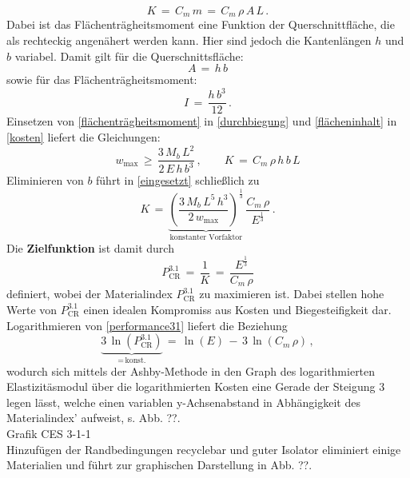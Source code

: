 \begin{equation} \label{kosten}
	K\,=\,C_m\,m\,=\,C_m\,\rho\,A\,L\,.
\end{equation}
Dabei ist das Flächenträgheitsmoment eine Funktion der Querschnittfläche, die als rechteckig angenähert werden kann. Hier sind jedoch die Kantenlängen $h$ und $b$ variabel. Damit gilt für die Querschnittsfläche:
\begin{equation} \label{flächeninhalt}
A\,=\,h\,b
\end{equation}
sowie für das Flächenträgheitsmoment:
\begin{equation} \label{flächenträgheitsmoment}
I\,=\,\frac{h\,b^3}{12}\,.
\end{equation}
Einsetzen von \ref{flächenträgheitsmoment} in \ref{durchbiegung} und \ref{flächeninhalt} in \ref{kosten} liefert die Gleichungen:
\begin{equation} \label{eingesetzt}
	w_{\text{max}}\,\ge\,\frac{3\,M_b \,L^2}{2\,E\,h\,b^3}\,, \qquad
	K\,=\,C_m\,\rho\,h\,b\,L
\end{equation}
Eliminieren von $b$ führt in \ref{eingesetzt} schließlich zu
\begin{equation}\label{performance}
K\,=\,\underbrace{\left(\frac{3\,M_b\,L^5\,h^3}{2\,w_{\text{max}}}\right)^{\frac{1}{3}}}_{\text{konstanter Vorfaktor}}\,\frac{C_m\,\rho}{E^{\frac{1}{3}}}\,.
\end{equation}
Die \textbf{Zielfunktion} ist damit durch
\begin{equation} \label{performance31}
P_{\text{CR}}^{3.1}\,=\,\frac{1}{K}\,=\,\frac{E^\frac{1}{3}}{C_m\,\rho}
\end{equation}
definiert, wobei der Materialindex $P_{\text{CR}}^{3.1}$ zu maximieren ist. Dabei stellen hohe Werte von $P_{\text{CR}}^{3.1}$ einen idealen Kompromiss aus Kosten und Biegesteifigkeit dar.\\
Logarithmieren von \ref{performance31} liefert die Beziehung
\begin{equation}
\underbrace{3\,\ln(P_{\text{CR}}^{3.1})}_{=\,\text{konst.}}\,=\,\ln(E)\,-\,3\,\ln(C_m\,\rho)\,,
\end{equation}
wodurch sich mittels der Ashby-Methode in den Graph des logarithmierten Elastizitäsmodul über die logarithmierten Kosten eine Gerade der Steigung 3 legen lässt, welche einen variablen y-Achsenabstand in Abhängigkeit des Materialindex' aufweist, s. Abb. ??.\\
Grafik CES 3-1-1\\
Hinzufügen der Randbedingungen \glqq recyclebar\grqq{} und \glqq guter Isolator\grqq{} eliminiert einige Materialien und führt zur graphischen Darstellung in Abb. ??.\\
